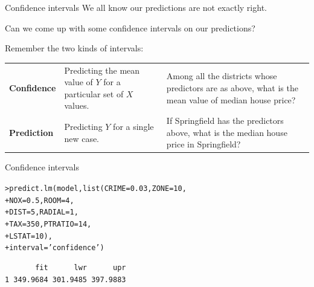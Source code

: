 \documentclass{beamer}\usepackage[]{graphicx}\usepackage[]{color}
\makeatletter
\newcommand{\hlnum}[1]{\textcolor[rgb]{0.824,0.412,0.118}{#1}}%
\newcommand{\hlstr}[1]{\textcolor[rgb]{1,0.894,0.71}{#1}}%
\newcommand{\hlstd}[1]{\textcolor[rgb]{1,0.894,0.769}{#1}}%
\newcommand{\hlkwc}[1]{\textcolor[rgb]{0.78,0.941,0.545}{#1}}%
\newcommand{\hlkwd}[1]{\textcolor[rgb]{1,0.78,0.769}{#1}}%
\newenvironment{kframe}{%
 \def\at@end@of@kframe{}%
 \ifinner\ifhmode%
  \def\at@end@of@kframe{\end{minipage}}%
  \begin{minipage}{\columnwidth}%
 \fi\fi%
 \def\FrameCommand##1{\hskip\@totalleftmargin \hskip-\fboxsep
 \colorbox{shadecolor}{##1}\hskip-\fboxsep
     \hskip-\linewidth \hskip-\@totalleftmargin \hskip\columnwidth}%
 \MakeFramed {\advance\hsize-\width
   \@totalleftmargin\z@ \linewidth\hsize
   \@setminipage}}%
 {\par\unskip\endMakeFramed%
 \at@end@of@kframe}
\newenvironment{knitrout}{}{} %
\makeatother
\begin{document}
\begin{darkframes}
    
    
    \begin{frame}[fragile]{Confidence intervals}
      We all know our predictions are not exactly right. 
      
      Can we come up with some confidence intervals on our predictions? \pause
      \bigskip
      
      Remember the two kinds of intervals:
      \bigskip

      \begin{tabular}{lp{1in}p{2in}}
        \textbf{Confidence} & Predicting the mean value of $Y$ for a particular  set of $X$ values. & Among all the districts whose predictors are as above, what is the mean value of median house price?  \\
        \textbf{Prediction} & Predicting $Y$ for a single new case. & If Springfield has the predictors above, what is the median house price in Springfield?\\
      \end{tabular}
    
    
    \end{frame}
        
      
    
    \begin{frame}[fragile]{Confidence intervals}
      \fontsize{9}{9}\selectfont
\begin{knitrout}
\begin{kframe}
\begin{alltt}
\hlstd{> }\hlkwd{predict.lm}\hlstd{(model,} \hlkwd{list}\hlstd{(}\hlkwc{CRIME}\hlstd{=}\hlnum{0.03}\hlstd{,} \hlkwc{ZONE}\hlstd{=}\hlnum{10}\hlstd{,}
\hlstd{+ }                       \hlkwc{NOX}\hlstd{=}\hlnum{0.5}\hlstd{,} \hlkwc{ROOM}\hlstd{=}\hlnum{4}\hlstd{,}
\hlstd{+ }                       \hlkwc{DIST}\hlstd{=}\hlnum{5}\hlstd{,}  \hlkwc{RADIAL}\hlstd{=}\hlnum{1}\hlstd{,}
\hlstd{+ }                       \hlkwc{TAX}\hlstd{=}\hlnum{350}\hlstd{,} \hlkwc{PTRATIO}\hlstd{=}\hlnum{14}\hlstd{,}
\hlstd{+ }                       \hlkwc{LSTAT}\hlstd{=}\hlnum{10}\hlstd{),}
\hlstd{+ }                       \hlkwc{interval} \hlstd{=} \hlstr{'confidence'}\hlstd{)}
\end{alltt}
\begin{verbatim}
       fit      lwr      upr
1 349.9684 301.9485 397.9883
\end{verbatim}
\end{kframe}
\end{knitrout}
     \lc
     \end{frame}
     

\end{darkframes}
\end{document}
